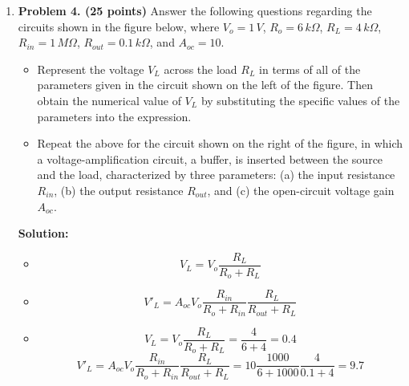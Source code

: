 \begin{enumerate}

 {\bf Solution:} 
 Apply Thevenin theorem to base circuit to get $R_B=R_1 || R_2=6.7K$, $V_BB=6.7V$.
 \[ I_B=(V_{BB}-V_{BE})/(R_B+(\beta+1)R_E)=6V/(6.7K+101\times 0.5K)=0.106 mA \]
 \[ I_C=I_E=10.6 mA \]
 \[ V_E=0.5\times 10.6=5.3V,\;\;\;\; V_C=20-0.5\times 10.6=14.7V,\;\;\;\;
 	V_{CE}=V_C-V_E=14.7-5.3=9.4V \]
 \[ v_1(t)=-5 cos(\omega t) V,\;\;\;\;v_1(t)=5 cos(\omega t) V	\]


\item {\bf Problem 4. (25 points)} 
  Answer the following questions regarding the circuits shown in the figure
  below, where $V_o=1\,V$, $R_o=6\,k\Omega$, $R_L=4\,k\Omega$, 
  $R_{in}=1\,M\Omega$, $R_{out}=0.1\,k\Omega$, and $A_{oc}=10$.
  \begin{itemize}
  \item Represent the voltage $V_L$ across the load $R_L$ in terms of all 
    of the parameters given in the circuit shown on the left of the figure. 
    Then obtain the numerical value of $V_L$ by substituting the specific 
    values of the parameters into the expression.
  \item Repeat the above for the circuit shown on the right of the figure,
    in which a voltage-amplification circuit, a buffer, is inserted between 
    the source and the load, characterized by three parameters: (a) the
    input resistance $R_{in}$, (b) the output resistance $R_{out}$, and 
    (c) the open-circuit voltage gain $A_{oc}$. 
  \end{itemize}

{\bf Solution:}
\begin{itemize}
\item \[ V_L=V_o \frac{R_L}{R_o+R_L} \]
\item \[ V'_L=A_{oc}V_o \frac{R_{in}}{R_o+R_{in}}\frac{R_L}{R_{out}+R_L} \]
\item \[ V_L=V_o \frac{R_L}{R_o+R_L}=\frac{4}{6+4}=0.4  \]
  \[ V'_L=A_{oc}V_o \frac{R_{in}}{R_o+R_{in}}\frac{R_L}{R_{out}+R_L} 
  =10\frac{1000}{6+1000}\frac{4}{0.1+4}=9.7 \]
\end{itemize}

\end{enumerate}



